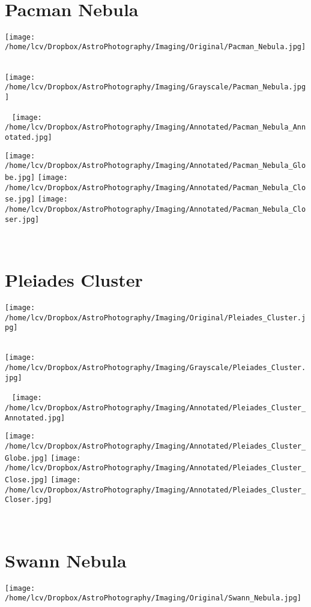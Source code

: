 \ \\\section{Pacman Nebula}
\texttt{[image: /home/lcv/Dropbox/AstroPhotography/Imaging/Original/Pacman\_Nebula.jpg]}
{\footnotesize\color{white}


}\ \\
\texttt{[image: /home/lcv/Dropbox/AstroPhotography/Imaging/Grayscale/Pacman\_Nebula.jpg]}
\begin{center}
 \ \newpage
\texttt{[image: /home/lcv/Dropbox/AstroPhotography/Imaging/Annotated/Pacman\_Nebula\_Annotated.jpg]}

\texttt{[image: /home/lcv/Dropbox/AstroPhotography/Imaging/Annotated/Pacman\_Nebula\_Globe.jpg]}
\texttt{[image: /home/lcv/Dropbox/AstroPhotography/Imaging/Annotated/Pacman\_Nebula\_Close.jpg]}
\texttt{[image: /home/lcv/Dropbox/AstroPhotography/Imaging/Annotated/Pacman\_Nebula\_Closer.jpg]}
\end{center}
\ \\\section{Pleiades Cluster}
\texttt{[image: /home/lcv/Dropbox/AstroPhotography/Imaging/Original/Pleiades\_Cluster.jpg]}
{\footnotesize\color{white}


}\ \\
\texttt{[image: /home/lcv/Dropbox/AstroPhotography/Imaging/Grayscale/Pleiades\_Cluster.jpg]}
\begin{center}
 \ \newpage
\texttt{[image: /home/lcv/Dropbox/AstroPhotography/Imaging/Annotated/Pleiades\_Cluster\_Annotated.jpg]}

\texttt{[image: /home/lcv/Dropbox/AstroPhotography/Imaging/Annotated/Pleiades\_Cluster\_Globe.jpg]}
\texttt{[image: /home/lcv/Dropbox/AstroPhotography/Imaging/Annotated/Pleiades\_Cluster\_Close.jpg]}
\texttt{[image: /home/lcv/Dropbox/AstroPhotography/Imaging/Annotated/Pleiades\_Cluster\_Closer.jpg]}
\end{center}
\ \\\section{Swann Nebula}
\texttt{[image: /home/lcv/Dropbox/AstroPhotography/Imaging/Original/Swann\_Nebula.jpg]}
